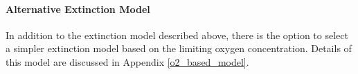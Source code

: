 \begin{enumerate}
\end{enumerate}

%
%
%

\paragraph{Alternative Extinction Model}

In addition to the extinction model described above, there is the option to select a simpler extinction model based on the limiting oxygen concentration. Details of this model are discussed in Appendix \ref{o2_based_model}.


